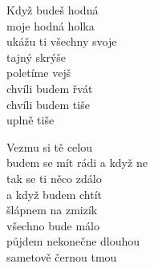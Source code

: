 
\begin{multicols}{2}
\singlespacing

\sloka{}

Když budeš hodná\\
moje hodná  holka\\
ukážu ti  všechny  svoje\\
tajný  skrýše\\
poletíme  vejš\\
chvíli budem  řvát\\
chvíli budem  tiše\\
uplně  tiše\\

\sloka{}

Vezmu si tě celou\\
budem se mít  rádi a  když  ne\\
tak se ti něco  zdálo\\
a když budem  chtít\\
šlápnem na  zmizík\\
všechno bude  málo\\
půjdem  nekonečne  dlouhou\\
sametově černou tmou\\


\end{multicols}